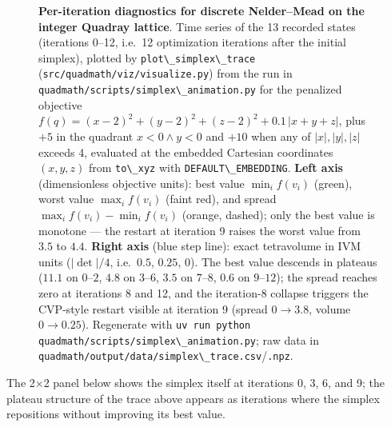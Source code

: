 \documentclass[
  10pt,
]{article}
\newcommand{\passthrough}[1]{#1}
\begin{document}
\begin{figure}
\caption{\textbf{Per-iteration diagnostics for discrete Nelder--Mead on
the integer Quadray lattice}. Time series of the 13 recorded states
(iterations 0--12, i.e.~12 optimization iterations after the initial
simplex), plotted by
\protect\passthrough{\lstinline!plot\_simplex\_trace!}
(\protect\passthrough{\lstinline!src/quadmath/viz/visualize.py!}) from
the run in
\protect\passthrough{\lstinline!quadmath/scripts/simplex\_animation.py!}
for the penalized objective
\(f(q) = (x-2)^2 + (y-2)^2 + (z-2)^2 + 0.1\,\lvert x+y+z\rvert\), plus
\(+5\) in the quadrant \(x<0 \wedge y<0\) and \(+10\) when any of
\(\lvert x\rvert, \lvert y\rvert, \lvert z\rvert\) exceeds 4, evaluated
at the embedded Cartesian coordinates \((x, y, z)\) from
\protect\passthrough{\lstinline!to\_xyz!} with
\protect\passthrough{\lstinline!DEFAULT\_EMBEDDING!}. \textbf{Left axis}
(dimensionless objective units): best value \(\min_i f(v_i)\) (green),
worst value \(\max_i f(v_i)\) (faint red), and spread
\(\max_i f(v_i) - \min_i f(v_i)\) (orange, dashed); only the best value
is monotone --- the restart at iteration 9 raises the worst value from
\(3.5\) to \(4.4\). \textbf{Right axis} (blue step line): exact
tetravolume in IVM units (\(\lvert\det\rvert/4\), i.e.~\(0.5\),
\(0.25\), \(0\)). The best value descends in plateaus (\(11.1\) on
\(0\)--\(2\), \(4.8\) on \(3\)--\(6\), \(3.5\) on \(7\)--\(8\), \(0.6\)
on \(9\)--\(12\)); the spread reaches zero at iterations 8 and 12, and
the iteration-8 collapse triggers the CVP-style restart visible at
iteration 9 (spread \(0 \to 3.8\), volume \(0 \to 0.25\)). Regenerate
with
\protect\passthrough{\lstinline!uv run python quadmath/scripts/simplex\_animation.py!};
raw data in
\protect\passthrough{\lstinline!quadmath/output/data/simplex\_trace.csv!}/\protect\passthrough{\lstinline!.npz!}.}
\end{figure}

The 2×2 panel below shows the simplex itself at iterations 0, 3, 6, and
9; the plateau structure of the trace above appears as iterations where
the simplex repositions without improving its best value.
\end{document}
